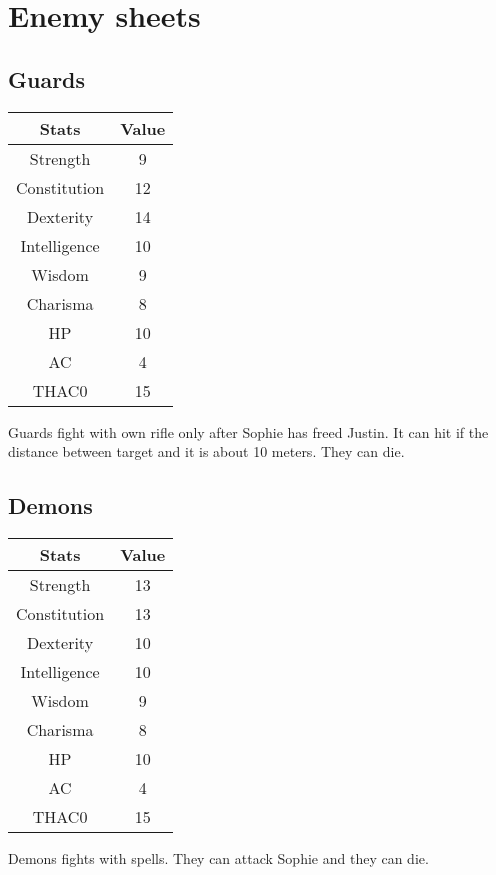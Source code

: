 \section{Enemy sheets}
\subsection{Guards}
\begin{table}[H]
  \centering
\begin{tabular}{|c|c|}
\hline
\rowcolor[HTML]{C0C0C0} 
\textbf{Stats} & \textbf{Value} \\ \hline
Strength & 9 \\ \hline
Constitution & 12 \\ \hline
Dexterity & 14 \\ \hline
Intelligence & 10 \\ \hline
Wisdom & 9 \\ \hline
Charisma & 8 \\ \hline
HP & 10 \\ \hline
AC & 4 \\ \hline
THAC0 & 15 \\ \hline
\end{tabular}
\end{table}
Guards fight with own rifle only after Sophie has freed Justin. It can hit if the distance between target and it is about 10 meters. They can die. 
\subsection{Demons}
\begin{table}[H]
  \centering
\begin{tabular}{|c|c|}
\hline
\rowcolor[HTML]{C0C0C0} 
\textbf{Stats} & \textbf{Value} \\ \hline
Strength & 13 \\ \hline
Constitution & 13 \\ \hline
Dexterity & 10 \\ \hline
Intelligence & 10 \\ \hline
Wisdom & 9 \\ \hline
Charisma & 8 \\ \hline
HP & 10 \\ \hline
AC & 4 \\ \hline
THAC0 & 15 \\ \hline
\end{tabular}
\end{table}
Demons fights with spells. They can attack Sophie and they can die. 

